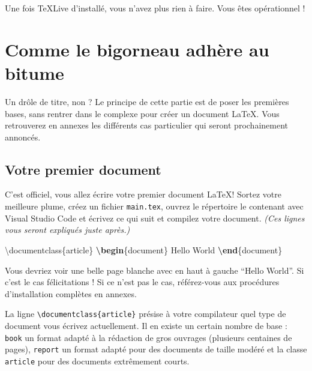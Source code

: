 \documentclass[A4paper
]{article}
\newenvironment{Shaded}{}{}
\newcommand{\BuiltInTok}[1]{#1}
\newcommand{\ExtensionTok}[1]{#1}
\newcommand{\KeywordTok}[1]{\textcolor[rgb]{0.00,0.44,0.13}{\textbf{#1}}}
\newcommand{\NormalTok}[1]{#1}
\begin{document}
Une fois \TeX Live d'installé, vous n'avez plus rien à faire. Vous êtes
opérationnel !

\hypertarget{comme-le-bigorneau-adhuxe8re-au-bitume}{%
\section{Comme le bigorneau adhère au
bitume}\label{comme-le-bigorneau-adhuxe8re-au-bitume}}

Un drôle de titre, non ? Le principe de cette partie est de poser les
premières bases, sans rentrer dans le complexe pour créer un document
\LaTeX. Vous retrouverez en annexes les différents cas particulier qui
seront prochainement annoncés.

\hypertarget{votre-premier-document}{%
\subsection{Votre premier document}\label{votre-premier-document}}

C'est officiel, vous allez écrire votre premier document \LaTeX ! Sortez
votre meilleure plume, créez un fichier \texttt{main.tex}, ouvrez le
répertoire le contenant avec Visual Studio Code et écrivez ce qui suit
et compilez votre document. \emph{(Ces lignes vous seront expliqués
juste après.)}

\begin{Shaded}
\begin{Highlighting}[]
\BuiltInTok{\textbackslash{}documentclass}\NormalTok{\{}\ExtensionTok{article}\NormalTok{\}}
\KeywordTok{\textbackslash{}begin}\NormalTok{\{}\ExtensionTok{document}\NormalTok{\}}
\NormalTok{Hello World }
\KeywordTok{\textbackslash{}end}\NormalTok{\{}\ExtensionTok{document}\NormalTok{\}}
\end{Highlighting}
\end{Shaded}

Vous devriez voir une belle page blanche avec en haut à gauche ``Hello
World''. Si c'est le cas félicitations ! Si ce n'est pas le cas,
référez-vous aux procédures d'installation complètes en annexes.

La ligne \texttt{\textbackslash{}documentclass\{article\}} présise à
votre compilateur quel type de document vous écrivez actuellement. Il en
existe un certain nombre de base : \texttt{book} un format adapté à la
rédaction de gros ouvrages (plusieurs centaines de pages),
\texttt{report} un format adapté pour des documents de taille modéré et
la classe \texttt{article} pour des documents extrêmement courts.
\end{document}
